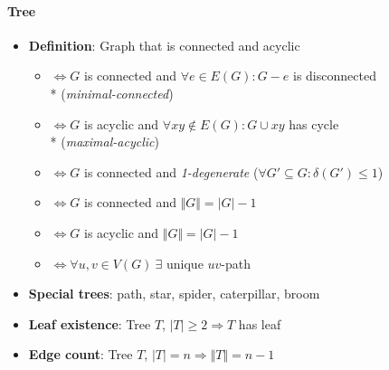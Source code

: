 \paragraph{Tree}
\begin{itemize}
  \item \textbf{Definition}: Graph that is connected and acyclic
  \begin{itemize}
    \item $ \Leftrightarrow G $ is connected and $ \forall e \in E(G): G-e $ is disconnected  \\*
      \phantom{$ \Leftrightarrow $} (\emph{minimal-connected})
    \item $ \Leftrightarrow G $ is acyclic and $ \forall xy \not \in E(G) : G \cup xy $ has cycle \\*
      \phantom{$ \Leftrightarrow $} (\emph{maximal-acyclic})
    \item $ \Leftrightarrow G $ is connected and \emph{1-degenerate} ($ \forall G' \subseteq G : \delta(G') \leq 1 $) 
    \item $ \Leftrightarrow G $ is connected and $ \Vert G \Vert = \vert G \vert - 1 $
    \item $ \Leftrightarrow G $ is acyclic and $ \Vert G \Vert = \vert G \vert - 1 $
    \item $ \Leftrightarrow \forall u,v \in V(G) \ \exists $ unique $ uv $-path
  \end{itemize}
  \item \textbf{Special trees}: path, star, spider, caterpillar, broom
  \item \textbf{Leaf existence}: Tree $ T $, $ \vert T \vert \geq 2 \Rightarrow T $ has leaf
  \item \textbf{Edge count}: Tree $ T $, $ \vert T \vert = n \Rightarrow \Vert T \Vert = n-1 $ 
\end{itemize}




